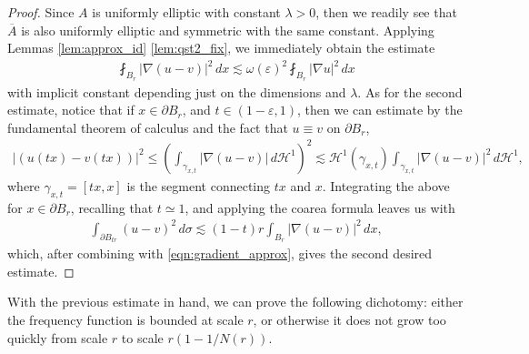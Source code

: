 \documentclass[12pt,leqno]{amsart}
\numberwithin{equation}{section}
\theoremstyle{definition}
\renewcommand{\epsilon}{\varepsilon}
\newcommand{\HD}{\mathcal{H}}
\newcommand{\abs}[1]{\left \lvert #1 \right \rvert}
\newcommand{\ol}{\overline}
\begin{document}
	\begin{proof}
		Since $A$ is uniformly elliptic with constant $\lambda >0$, then we readily see that $\ol{A}$ is also uniformly elliptic and symmetric with the same constant. Applying Lemmas \ref{lem:approx_id} \ref{lem:qst2_fix}, we immediately obtain the estimate
		\begin{align}\label{eqn:gradient_approx}
			\fint_{B_r} \abs{\nabla(u-v)}^2 \, dx \lesssim \omega(\epsilon)^2 \fint_{B_r} \abs{\nabla u}^2 \, dx 
		\end{align}
		with implicit constant depending just on the dimensions and $\lambda$. As for the second estimate, notice that if $x \in \partial B_r$, and $t \in (1- \epsilon ,1)$, then we can estimate by the fundamental theorem of calculus and the fact that $u \equiv v$ on $\partial B_r$, 
		\begin{align*}
			\abs{(u(tx) - v(tx))}^2 \le \left( \int_{\gamma_{x,t}} \abs{ \nabla(u-v)  } \, d\HD^1\right)^2 \lesssim \HD^{1}(\gamma_{x,t}) \int_{\gamma_{x,t}} \abs{ \nabla (u-v)}^2 \, d\HD^1,
		\end{align*}
		where $\gamma_{x,t} = [tx, x]$ is the segment connecting $tx$ and $x$. Integrating the above for $x \in \partial B_r$, recalling that $t \simeq 1$, and applying the coarea formula leaves us with
		\begin{align*}
			\int_{\partial B_{tr}} (u-v)^2 \, d\sigma \lesssim (1-t)r \int_{B_r} \abs{ \nabla(u-v) }^2 \, dx,
		\end{align*}
		which, after combining with \eqref{eqn:gradient_approx}, gives the second desired estimate.
	\end{proof}
	
	With the previous estimate in hand, we can prove the following dichotomy: either the frequency function is bounded at scale $r$, or otherwise it does not grow too quickly from scale $r$ to scale $r(1-1/N(r))$. 
	
\end{document}
